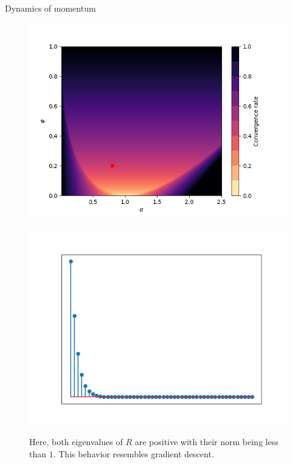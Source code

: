 \documentclass[11pt,compress,t,notes=noshow, xcolor=table]{beamer}
\begin{document}
\begin{vbframe}{Dynamics of momentum}
\framebreak
\vspace*{1.0cm}
\begin{figure}
	\includegraphics[height=0.35\textwidth, keepaspectratio]{figure_man/momentum_conv_mono.png} ~~ \includegraphics[height=0.35\textwidth, keepaspectratio]{figure_man/momentum_mono.png} \\
	\begin{footnotesize} 
		Here, both eigenvalues of $R$ are positive with their norm being less than $1$. This behavior resembles gradient descent. 
	\end{footnotesize}
\end{figure}


\end{vbframe}
\end{document}
